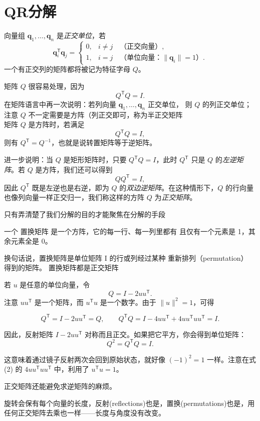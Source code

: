 
\chapter{QR分解}
\begin{definition}[正交单位向量组]
向量组 $\bm q_1,\ldots,\bm q_n$ 是\emph{正交单位}，若
$$
\bm q_i^{\mathsf T}\bm q_j=
\begin{cases}
0,& i\ne j \quad\text{（正交向量）},\\[2pt]
1,& i=j \quad\text{（单位向量：}\lVert \bm q_i\rVert=1\text{）}.
\end{cases}
$$
一个有正交列的矩阵都将被记为特征字母 $Q$。
\end{definition}

矩阵 $Q$ 很容易处理，因为
$$
Q^{\mathsf T}Q=I .
$$
在矩阵语言中再一次说明：若列向量 $\bm q_1,\ldots,\bm q_n$ 正交单位，
则 $Q$ 的列正交单位；注意 $Q$ 不一定需要是方阵（列正交即可，称为半正交矩阵\\矩阵 $Q$ 是方阵时，若满足
\[
Q^{\mathsf T} Q = I ,
\]
则有 $Q^{\mathsf T} = Q^{-1}$，也就是说转置矩阵等于逆矩阵。

进一步说明：当 $Q$ 是矩形矩阵时，只要 $Q^{\mathsf T} Q = I$，此时 $Q^{\mathsf T}$ 只是 $Q$ 的\emph{左逆矩阵}。若 $Q$ 是方阵，我们还可以得到
\[
Q Q^{\mathsf T} = I ,
\]
因此 $Q^{\mathsf T}$ 既是左逆也是右逆，即为 $Q$ 的\emph{双边逆矩阵}。在这种情形下，$Q$ 的行向量也像列向量一样正交归一，我们称这样的方阵 $Q$ 为\emph{正交矩阵}。\\
\begin{dxtips}[正交化的好处需要牢记]只有弄清楚了我们分解的目的才能聚焦在分解的手段
    
\end{dxtips}
一个 置换矩阵 是一个方阵，它的每一行、每一列里都有 且仅有一个元素是 1，其余元素全是 0。

换句话说，置换矩阵是单位矩阵 I 的行或列经过某种 重新排列（permutation） 得到的矩阵。
置换矩阵都是正交矩阵
\begin{example}[反射]
若 $u$ 是任意的单位向量，令
\[
Q = I - 2uu^{\mathsf T}.
\]
注意 $uu^{\mathsf T}$ 是一个矩阵，而 $u^{\mathsf T}u$ 是一个数字。由于 $\lVert u \rVert^2 = 1$，可得

\[
Q^{\mathsf T} = I - 2uu^{\mathsf T} = Q, \qquad 
Q^{\mathsf T}Q = I - 4uu^{\mathsf T} + 4uu^{\mathsf T}uu^{\mathsf T} = I. \tag{2}
\]

因此，反射矩阵 $I-2uu^{\mathsf T}$ 对称而且正交。如果把它平方，你会得到单位矩阵：
\[
Q^2 = Q^{\mathsf T}Q = I.
\]

这意味着通过镜子反射两次会回到原始状态，就好像 $(-1)^2=1$ 一样。注意在式 (2) 的 $4uu^{\mathsf T}uu^{\mathsf T}$ 中，利用了 $u^{\mathsf T}u=1$。
\end{example}   
\begin{dxtips}
    正交矩阵还能避免求逆矩阵的麻烦。
\end{dxtips}
旋转会保有每个向量的长度，反射(reflections)也是，置换(permutations)也是，用任何正交矩阵去乘也一样——长度与角度没有改变。  

